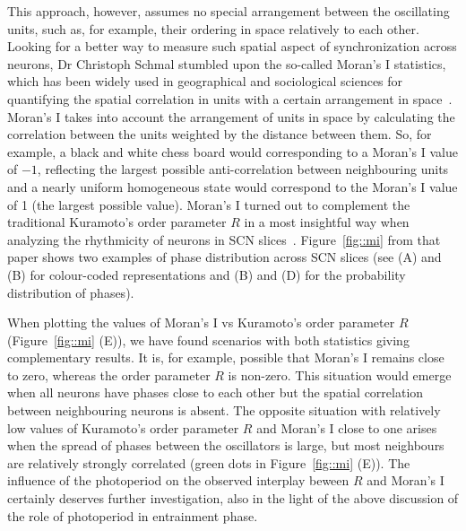 This approach, however, assumes no special arrangement between the
oscillating units, such as, for example, their ordering in space
relatively to each other. Looking for a better way to measure such
spatial aspect of synchronization across neurons, Dr Christoph Schmal
stumbled upon the so-called Moran's I statistics, which has been
widely used in geographical and sociological sciences for quantifying
the spatial correlation in units with a certain arrangement in
space~\cite{moran1950notes}. Moran's I takes into account the
arrangement of units in space by calculating the correlation between
the units weighted by the distance between them. So, for example, a
black and white chess board would corresponding to a Moran's I value
of $-1$, reflecting the largest possible anti-correlation between
neighbouring units and a nearly uniform homogeneous state would
correspond to the Moran's I value of 1 (the largest possible value).
Moran's I turned out to complement the traditional Kuramoto's order
parameter $R$ in a most insightful way when analyzing the rhythmicity
of neurons in SCN slices~\cite{schmal2017moran}. Figure~\ref{fig::mi}
from that paper shows two examples of phase distribution across SCN
slices (see (A) and (B) for colour-coded representations and (B) and
(D) for the probability distribution of phases).

When plotting the values of Moran's I vs Kuramoto's order parameter
$R$ (Figure~\ref{fig::mi} (E)), we have found scenarios with both
statistics giving complementary results. It is, for example, possible
that Moran's I remains close to zero, whereas the order parameter $R$
is non-zero. This situation would emerge when all neurons have phases
close to each other but the spatial correlation between neighbouring
neurons is absent. The opposite situation with relatively low values
of Kuramoto's order parameter $R$ and Moran's I close to one arises
when the spread of phases between the oscillators is large, but most
neighbours are relatively strongly correlated (green dots in
Figure~\ref{fig::mi} (E)). The influence of the photoperiod on the
observed interplay beween $R$ and Moran's I certainly deserves further
investigation, also in the light of the above discussion of the role
of photoperiod in entrainment phase.
